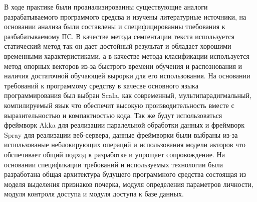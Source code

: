 \label{sec:practice_outro}

В ходе практике были проанализированны существующие аналоги разрабатываемого программого средсва и изучены литературные источники, на основании анализа были составлены и специфицированны тпебования к разбабатываемому ПС. В качестве метода семгентации текста используется статический метод так он дает достойный результат и обладает хорошими временными характеристиками, а в качестве метода класификации используется метод опорных векторов из-за быстрого времени обучения и распознования и наличия достаточной обучающей вырорки для его использования. На основании требований к программому средству в качесве основного языка программирования был выбран Scala, как современный, мультипарадигмальный, компилируемый язык что обеспечит высокую производительность вместе с выразительностью и компактностью кода. Так же будут использоваться фреймворк Akka для реализации паралельной обработки данных и фреймворк Spray для реализации веб-сервера, данные фреймворки были выбраны из-за использованые неблокирующих операций и использования модели акторов что обспечивает общий подход к разработке и упрощает сопровождение. На основании спецификации требований и используемых технологии была разработана общая архитектура будущего программного средства состоящая из моделя выделения признаков почерка, модуля определения параметров личности, модуля контроля доступа и модуля доступа к базе данных.
